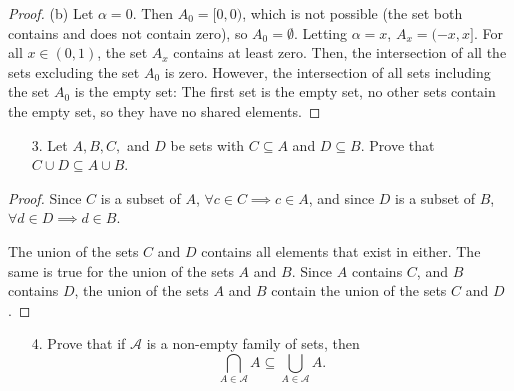 \documentclass[10pt]{article}
\theoremstyle{definition}
\theoremstyle{plain}
\begin{document}
\begin{proof}{(b)}
 Let $\alpha=0$. Then $A_0=[0,0)$, which is not possible (the set both contains and does not contain zero), so $A_0=\emptyset$. Letting $\alpha=x$, $A_x=(-x,x]$. For all $x\in(0,1)$, the set $A_x$ contains at least zero. Then, the intersection of all the sets excluding the set $A_0$ is zero. However, the intersection of all sets including the set $A_0$ is the empty set: The first set is the empty set, no other sets contain the empty set, so they have no shared elements.
\end{proof}



\pagebreak



\begin{enumerate}
  \item[3.] Let $A, B, C,$ and $D$ be sets with $C \subseteq A$ and $D \subseteq B$.  Prove that $C \cup D \subseteq A \cup B$.
\end{enumerate}

\begin{proof}
  Since $C$ is a subset of $A$, $\forall c\in C \implies c\in A$, and since $D$ is a subset of $B$, $\forall d\in D \implies d\in B$. \\

  \par The union of the sets $C$ and $D$ contains all elements that exist in either. The same is true for the union of the sets $A$ and $B$. Since $A$ contains $C$, and $B$ contains $D$, the union of the sets $A$ and $B$ contain the union of the sets $C$ and $D$.
\end{proof}



\pagebreak



\begin{enumerate}
  \item[4.] Prove that if $\mathcal{A}$ is a non-empty family of sets, then $$\bigcap_{A \in \mathcal{A}}A \subseteq \bigcup_{A \in \mathcal{A}} A.$$
\end{enumerate}
\end{document}
